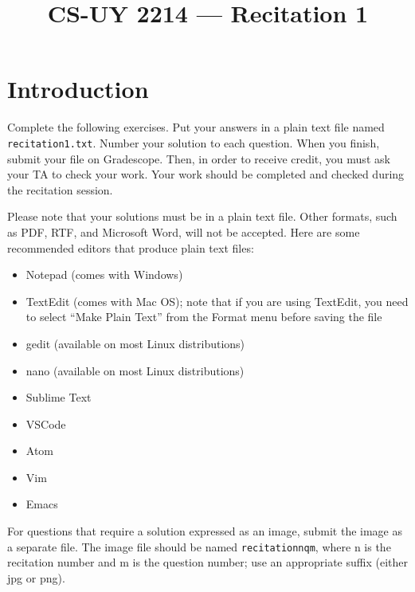 \documentclass{article}
\title{CS-UY 2214 — Recitation 1}
\date{}
\begin{document}
\maketitle

\section*{Introduction}
Complete the following exercises. Put your answers in a plain text file named \texttt{recitation1.txt}. Number your solution to each question. When you finish, submit your file on Gradescope. Then, in order to receive credit, you must ask your TA to check your work. Your work should be completed and checked during the recitation session.

Please note that your solutions must be in a plain text file. Other formats, such as PDF, RTF, and Microsoft Word, will not be accepted. Here are some recommended editors that produce plain text files:
\begin{itemize}
    \item Notepad (comes with Windows)
    \item TextEdit (comes with Mac OS); note that if you are using TextEdit, you need to select “Make Plain Text” from the Format menu before saving the file
    \item gedit (available on most Linux distributions)
    \item nano (available on most Linux distributions)
    \item Sublime Text
    \item VSCode
    \item Atom
    \item Vim
    \item Emacs
\end{itemize}

For questions that require a solution expressed as an image, submit the image as a separate file. The image file should be named \texttt{recitationnqm}, where n is the recitation number and m is the question number; use an appropriate suffix (either jpg or png).
\end{document}
